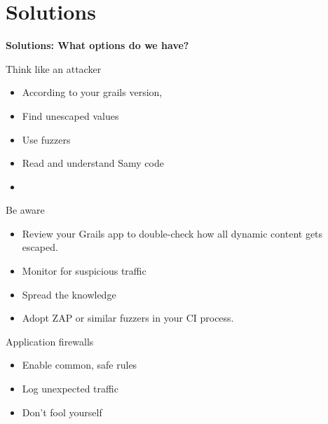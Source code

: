 
\section{Solutions}

\begin{frame}[plain]
    \begin{center}
      \Huge\bfseries
      Solutions: What options do we have?
    \end{center}
\end{frame}

\begin{frame}{Think like an attacker}
  \begin{itemize}[<+-| alert@+>]
    \item According to your grails version, 
    \item Find unescaped values
    \item Use fuzzers
    \item Read and understand Samy code
    \item 
  \end{itemize}
\end{frame}

\begin{frame}{Be aware}
  \begin{itemize}[<+-| alert@+>]
    \item Review your Grails app to double-check how all dynamic content gets escaped.
    \item Monitor for suspicious traffic
    \item Spread the knowledge
    \item Adopt ZAP or similar fuzzers in your CI process.
  \end{itemize}
\end{frame}

\begin{frame}{Application firewalls}
 \begin{itemize}[<+-| alert@+>]
   \item Enable common, safe rules
   \item Log unexpected traffic
   \item Don't fool yourself
 \end{itemize}
\end{frame}
